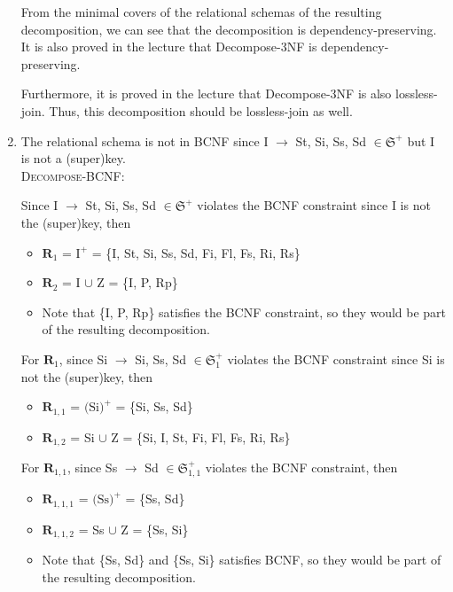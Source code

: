\documentclass[12pt]{article}
\begin{document}
\begin{enumerate}
        From the minimal covers of the relational schemas of the resulting
        decomposition, we can see that the decomposition is
        dependency-preserving. It is also proved in the lecture that
        Decompose-3NF is dependency-preserving.

        Furthermore, it is proved in the lecture that Decompose-3NF is also
        lossless-join. Thus, this decomposition should be lossless-join as well.
  \ \\

  \item The relational schema is not in BCNF since I $\longrightarrow$ St, Si,
        Ss, Sd $\in \mathfrak{S}^+$ but I is not a (super)key. \\

        \textsc{Decompose-BCNF}:

        Since I $\longrightarrow$ St, Si, Ss, Sd $\in \mathfrak{S}^+$ violates
        the BCNF constraint since I is not the (super)key, then
        \begin{itemize}
          \item $\textbf{R}_1$ = $\text{I}^+$ 
                               = \{I, St, Si, Ss, Sd, Fi, Fl, Fs, Ri, Rs\}
          \item $\textbf{R}_2$ = I $\cup$ Z
                               = \{I, P, Rp\}
          \item Note that \{I, P, Rp\} satisfies the BCNF constraint, so they
                would be part of the resulting decomposition.
        \end{itemize}

        For $\textbf{R}_1$, since Si $\longrightarrow$ Si, Ss, Sd $\in
        \mathfrak{S}_1^+$ violates the BCNF constraint since Si is not the
        (super)key, then
        \begin{itemize}
          \item $\textbf{R}_{1, 1}$ = $\text{(Si)}^+$
                                    = \{Si, Ss, Sd\}
          \item $\textbf{R}_{1, 2}$ = Si $\cup$ Z
                                    = \{Si, I, St, Fi, Fl, Fs, Ri, Rs\}
        \end{itemize}

        For $\textbf{R}_{1,1}$, since Ss $\longrightarrow$ Sd $\in
        \mathfrak{S}_{1,1}^+$ violates the BCNF constraint, then
        \begin{itemize}
          \item $\textbf{R}_{1,1,1}$ = $\text{(Ss)}^+$
                                     = \{Ss, Sd\}
          \item $\textbf{R}_{1,1,2}$ = Ss $\cup$ Z
                                     = \{Ss, Si\}
          \item Note that \{Ss, Sd\} and \{Ss, Si\} satisfies BCNF, so they
                would be part of the resulting decomposition.
        \end{itemize}


\end{enumerate}
\end{document}
